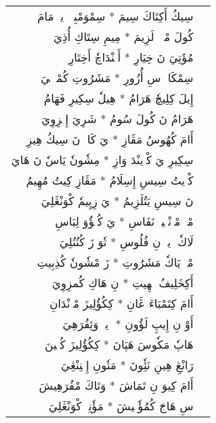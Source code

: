 \documentclass[a4paper, 12pt]{report}
\begin{document}
\begin{longtable}{rl}
\textarabic{سِيكُ أَكِتَاكَ سِيمَ  *  سِمْوَمْبِيٖ إٖيوٖ مَامَ} & \\ 
\textarabic{كُولَ مْتٖئٖ لَزِيمَ  *  مِيمِ سِتَاكِ أُذِيَ} & \\ 
[8mm] 

\textarabic{مُؤَتِيَ نَ خِيَارِ  *  أَپٖنْدَاچٗ أَخِتَارِ} & \\ 
\textarabic{سِمْكَازٖ سِ أُزُورِ  *  مَشَرُوتِ كُمْوٖكٖيَ} & \\ 
[8mm] 

\textarabic{إِيلَ كِلِيچٗ هَرَامُ  *  هِيلٗ سِكِيرِ فَهَامُ} & \\ 
\textarabic{هَرَامُ نَ كُولَ سُومُ  *  شَرِيَ إِمٖزِوِيَ} & \\ 
[8mm] 

\textarabic{أَامَ كُهُوسُ مَڤَازِ  *  يَ كَايٖ نَ سِيكُ هِيزِ} & \\ 
\textarabic{سِكِيرِ يَ كْوٖينْدَ وَازِ  *  مِشٗونٗ يَاسٗ نَ هَايَ} & \\ 
[8mm] 

\textarabic{كْوٖيتُ سِيسِ إِسِلَامُ  *  مَڤَازِ كِيتُ مُهِيمُ} & \\ 
\textarabic{نَ سِيسِ يَتُلَزِيمُ  *  يَ زِپِيمٗ كْوَنْڠَلِيَ} & \\ 
[8mm] 

\textarabic{مْپٖ مْوٖنْيٖيوٖ نَفَاسِ  *  يَ كُتٖؤُوَ لِبَاسِ} & \\ 
\textarabic{لَاكٗ وٖيوٖ نِ فُلُوسِ  *  تٗوَ زَ كُنُنُلِيَ} & \\ 
[8mm] 

\textarabic{مْپٖ يَاكٗ مَشَرُوتِ  *  زَ مْشٗونٗ كُذِبِيتِ} & \\ 
\textarabic{أَكِخَلِيفُ مٖهِيتِ  *  نِ هَاكِ كُمزِوِيَ} & \\ 
[8mm] 

\textarabic{أَامَ كِتَمْبَاءَ ڠَانِ  *  كِكُؤُلِيزَ مْوٖنْدَانِ} & \\ 
\textarabic{أَوْ نِ إِيپِ لَؤُونِ  *  وٖيوٖ وَئِفُرَهِيَ} & \\ 
[8mm] 

\textarabic{هَاپٗ مَكٗوسَ هَپَانَ  *  كِكُؤُلِيزَ كُنٖينَ} & \\ 
\textarabic{رَانْڠِ هِينِ نَئِٗونَ  *  مَتٗونِ إِمٖنِنْڠِيَ} & \\ 
[8mm] 

\textarabic{أَامَ كِيوَ نِ تَمَاشَ  *  وَتَاكَ مْفُرَهِيشَ} & \\ 
\textarabic{سِ هَاجَ كُمُؤٗنٖيشَ  *  مَؤٗنِيٖ كْوَنْڠَلِيَ} & \\ 
[8mm] 


\end{longtable}
\end{document}
